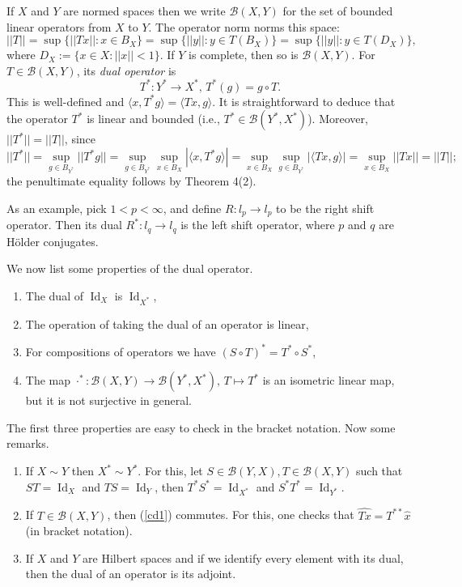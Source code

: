 If $X$ and $Y$ are normed spaces then we write $\mathcal{B}(X,Y)$ for the set of bounded
linear operators from $X$ to $Y$. The operator norm norms this space:
$$
  ||T||=\sup\{||Tx||:x\in B_X\}
       =\sup\{||y||:y\in T(B_X)\}
       =\sup\{||y||:y\in T(D_X)\},
$$
where $D_X:=\{x\in X : ||x||<1\}$.
If $Y$ is complete, then so is $\mathcal{B}(X,Y)$.
For $T\in\mathcal{B}(X,Y)$, its \emph{dual operator} is
$$T^*:Y^*\to X^*,\, T^*(g)=g\circ T.$$
This is well-defined and
$\langle x, T^* g\rangle = \langle Tx, g\rangle$.
It is straightforward to deduce that the operator $T^*$ is linear and bounded (i.e., $T^*\in\mathcal{B}(Y^*,X^*) $).
Moreover, $||T^*||=||T||$,
since
$$||T^*||
=\sup_{g\in B_{Y^*}} ||T^*g||
=\sup_{g\in B_{Y^*}}\sup_{x\in B_X}|\langle x,T^* g\rangle |
=\sup_{x\in B_X}\sup_{g\in B_{Y^*}}|\langle T x,g\rangle |
=\sup_{x\in B_X}||Tx||=||T||;$$
the penultimate equality follows by Theorem 4(2).

As an example, pick $1<p<\infty$, and define $R:l_p\to l_p$ to be the right shift operator.
Then its dual $R^*:l_q\to l_q$ is the left shift operator, where $p$ and $q$ are H\"older conjugates.

We now list some properties of the dual operator.
\begin{enumerate}
  \item The dual of $\operatorname{Id}_X$ is $\operatorname{Id}_{X^*}$,
  \item The operation of taking the dual of an operator is linear,
  \item For compositions of operators we have
  $(S\circ T)^*=T^*\circ S^*$,
  \item The map $\cdot^*:\mathcal{B}(X,Y)\to \mathcal{B}(Y^*,X^*),\,T\mapsto T^*$
  is an isometric linear map, but it is not surjective in general.
\end{enumerate}
The first three properties are easy to check in the bracket notation.
Now some remarks.
\begin{enumerate}
  \item If $X\sim Y$ then $X^*\sim Y^*$. For this, let $S\in \mathcal{B}(Y,X), T\in \mathcal{B}(X,Y)$
  such that $ST = \operatorname{Id}_X$ and $TS=\operatorname{Id}_Y$,
  then $T^*S^*=\operatorname{Id}_{X^*}$ and $S^*T^*=\operatorname{Id}_{Y^*}$.
  \item If $T\in \mathcal{B}(X,Y)$, then (\ref{cd1}) commutes.
  For this, one checks that $\hat {Tx}=T^{**}\hat x$ (in bracket notation).
  \item If $X$ and $Y$ are Hilbert spaces and if we identify every element with its dual,
  then the dual of an operator is its adjoint.
\end{enumerate}

